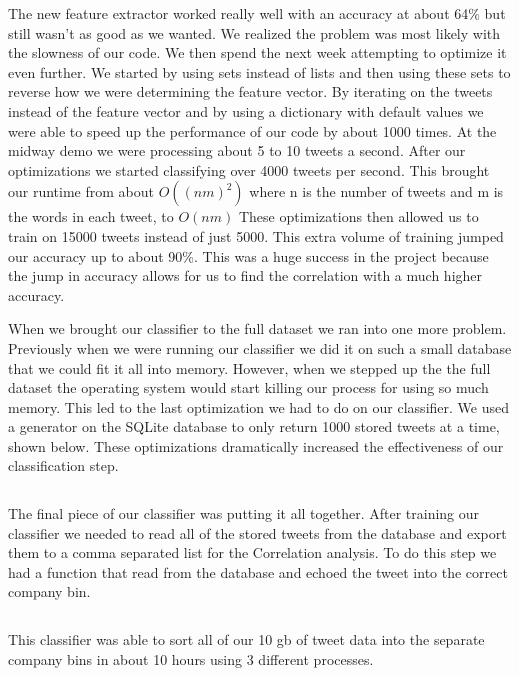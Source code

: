 \documentclass{acm_proc_article-sp}
\begin{document}
\break
\inputminted{python}{examples/train.py}

The new feature extractor worked really well with an accuracy at about 64\% but
still wasn't as good as we wanted. We realized the problem was most likely with
the slowness of our code. We then spend the next week attempting to optimize it
even further. We started by using sets instead of lists and then using these
sets to reverse how we were determining the feature vector. By iterating on the
tweets instead of the feature vector and by using a dictionary with default
values we were able to speed up the performance of our code by about 1000
times. At the midway demo we were processing about 5 to 10 tweets a second.
After our optimizations we started classifying over 4000 tweets per second.
This brought our runtime from about $O((nm)^2)$ where n is the number of tweets
and m is the words in each tweet, to $O(nm)$ These optimizations then allowed
us to train on 15000 tweets instead of just 5000. This extra volume of training
jumped our accuracy up to about 90\%. This was a huge success in the project
because the jump in accuracy allows for us to find the correlation with a much
higher accuracy. 

When we brought our classifier to the full dataset we ran into one more
problem.  Previously when we were running our classifier we did it on such a
small database that we could fit it all into memory. However, when we stepped
up the the full dataset the operating system would start killing our process
for using so much memory. This led to the last optimization we had to do on our
classifier. We used a generator on the SQLite database to only return 1000
stored tweets at a time, shown below. These optimizations dramatically
increased the effectiveness of our classification step.

\inputminted{python}{examples/generator.py}

The final piece of our classifier was putting it all together. After training
our classifier we needed to read all of the stored tweets from the database and
export them to a comma separated list for the Correlation analysis. To do this
step we had a function that read from the database and echoed the tweet into
the correct company bin.

\inputminted{python}{examples/converter.py}

This classifier was able to sort all of our 10 gb of tweet data into the
separate company bins in about 10 hours using 3 different processes. 
\end{document}
